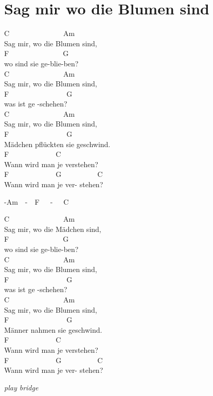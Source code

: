 \documentclass[
  letterpaper,
  a5paper]{memoir}
\begin{document}
\hypertarget{sag-mir-wo-die-blumen-sind}{%
\chapter{Sag mir wo die Blumen sind}\label{sag-mir-wo-die-blumen-sind}}

C~~~~~~~~~~~~~~~Am~~~~~~~~~~~\\
Sag mir, wo die Blumen sind,\\
F~~~~~~~~~~~~~~~G\\
wo sind sie ge-blie-ben?\\
C~~~~~~~~~~~~~~~Am~~~~~~~~~~~\\
Sag mir, wo die Blumen sind,\\
F~~~~~~~~~~~~~~~~G\\
was ist ge -schehen?\\
C~~~~~~~~~~~~~~~Am~~~~~~~~~~~\\
Sag mir, wo die Blumen sind,\\
F~~~~~~~~~~~~~~~~G\\
Mädchen pflückten sie geschwind.\\
F~~~~~~~~~~~~~C~~~~~~~~~~~~~~~~~\\
Wann wird man je verstehen?~~~~~\\
F~~~~~~~~~~~~~G~~~~~~~~~~C\\
Wann wird man je ver- stehen?

-Am~~-~~F~~~-~~~C

C~~~~~~~~~~~~~~~Am~~~~~~~~~~~\\
Sag mir, wo die Mädchen sind,\\
F~~~~~~~~~~~~~~~G\\
wo sind sie ge-blie-ben?\\
C~~~~~~~~~~~~~~~Am~~~~~~~~~~~\\
Sag mir, wo die Blumen sind,\\
F~~~~~~~~~~~~~~~~G\\
was ist ge -schehen?\\
C~~~~~~~~~~~~~~~Am~~~~~~~~~~~\\
Sag mir, wo die Blumen sind,\\
F~~~~~~~~~~~~~~~~G\\
Männer nahmen sie geschwind.\\
F~~~~~~~~~~~~~C~~~~~~~~~~~~~~~~~\\
Wann wird man je verstehen?~~~~~\\
F~~~~~~~~~~~~~G~~~~~~~~~~C\\
Wann wird man je ver- stehen?

\emph{play bridge}
\end{document}
